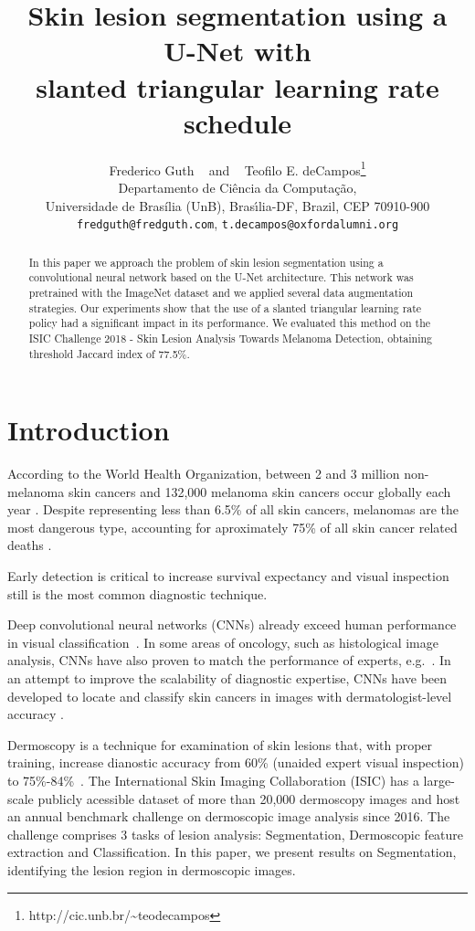 \documentclass{article}
\title{Skin lesion segmentation using a U-Net with\\
  slanted triangular learning rate schedule}
\author{
  Frederico Guth ~ and ~ Teofilo E. deCampos\thanks{http://cic.unb.br/\~{}teodecampos}\\
  Departamento de Ciência da Computação,\\
  Universidade de Brasília (UnB), Bras\'{\i}lia-DF, Brazil, CEP 70910-900 \\
  \texttt{fredguth@fredguth.com}, \texttt{t.decampos@oxfordalumni.org}
}
\begin{document}

\maketitle

\begin{abstract}
  In this paper we approach the problem of skin lesion segmentation using a
  convolutional neural network based on the U-Net architecture.
  This network was pretrained with the ImageNet dataset
  and we applied several data augmentation strategies.
  Our experiments show that the use of a slanted triangular learning rate policy
  had a significant impact in its performance.
  We evaluated this method on the ISIC Challenge 2018 - Skin Lesion
  Analysis Towards Melanoma Detection, obtaining threshold Jaccard index of 77.5\%.
\end{abstract}

\section{Introduction}

According to the World Health Organization, between 2 and 3 million
non-melanoma skin cancers and 132,000 melanoma skin cancers occur
globally each year \cite{who}. Despite representing less than 6.5\% of
all skin cancers, melanomas are the most dangerous type, accounting
for aproximately 75\% of all skin cancer related deaths
\cite{who,nature}.

Early detection is critical to increase survival expectancy and visual
inspection still is the most common diagnostic technique.

Deep convolutional neural networks (CNNs) already exceed human
performance in visual classification~\cite{fei}.
In some areas of oncology, such as histological image analysis, CNNs
have also proven to match the performance of experts,
e.g.\ \cite{veta_etal_mia2015}.  In an attempt to improve the
scalability of diagnostic expertise, CNNs have been developed to
locate and classify skin cancers in images with dermatologist-level
accuracy \cite{nature}.

Dermoscopy is a technique for examination of skin lesions that, with
proper training, increase dianostic accuracy from 60\% (unaided expert
visual inspection) to 75\%-84\%~\cite{isic}. The International Skin
Imaging Collaboration (ISIC) has a large-scale publicly acessible
dataset of more than 20,000 dermoscopy images and host an annual
benchmark challenge on dermoscopic image analysis since 2016.  The
challenge comprises 3 tasks of lesion analysis: Segmentation,
Dermoscopic feature extraction and Classification.  In this paper, we
present results on Segmentation, identifying the lesion region in 
dermoscopic images.
\end{document}
